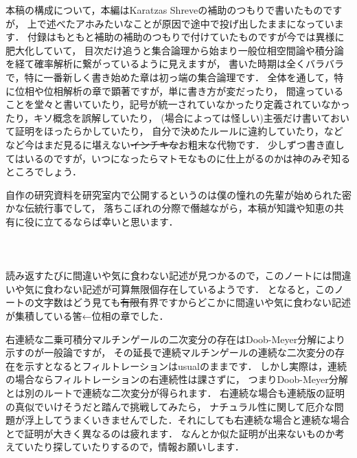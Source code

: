 本稿の構成について，本編はKaratzas Shreveの補助のつもりで書いたものですが，
上で述べたアホみたいなことが原因で途中で投げ出したままになっています．
付録はもともと補助の補助のつもりで付けていたものですが今では異様に肥大化していて，
目次だけ追うと集合論理から始まり一般位相空間論や積分論を経て確率解析に繋がっているように見えますが，
書いた時期は全くバラバラで，特に一番新しく書き始めた章は初っ端の集合論理です．
全体を通して，特に位相や位相解析の章で顕著ですが，単に書き方が変だったり，
間違っていることを堂々と書いていたり，記号が統一されていなかったり定義されていなかったり，キソ概念を誤解していたり，
(場合によっては怪しい)主張だけ書いておいて証明をほったらかしていたり，
自分で決めたルールに違約していたり，などなど今はまだ見るに堪えない\sout{インチキな}お粗末な代物です．
少しずつ書き直してはいるのですが，いつになったらマトモなものに仕上がるのかは神のみぞ知るところでしょう．

自作の研究資料を研究室内で公開するというのは僕の憧れの先輩が始められた密かな伝統行事でして，
落ちこぼれの分際で僭越ながら，本稿が知識や知恵の共有に役に立てるならば幸いと思います．
\\
\\
\\
\\
読み返すたびに間違いや気に食わない記述が見つかるので，このノートには間違いや気に食わない記述が可算無限個存在しているようです．
となると，このノートの文字数はどう見ても\sout{有限}有界ですからどこかに間違いや気に食わない記述が集積している筈←位相の章でした．

右連続な二乗可積分マルチンゲールの二次変分の存在はDoob-Meyer分解により示すのが一般論ですが，
その延長で連続マルチンゲールの連続な二次変分の存在を示すとなるとフィルトレーションはusualのままです．
しかし実際は，連続の場合ならフィルトレーションの右連続性は課さずに，
つまりDoob-Meyer分解とは別のルートで連続な二次変分が得られます．
右連続な場合も連続版の証明の真似でいけそうだと踏んで挑戦してみたら，
ナチュラル性に関して厄介な問題が浮上してうまくいきませんでした．それにしても右連続な場合と連続な場合とで証明が大きく異なるのは疲れます．
なんとか似た証明が出来ないものか考えていたり探していたりするので，情報お願いします．
\\
\\
